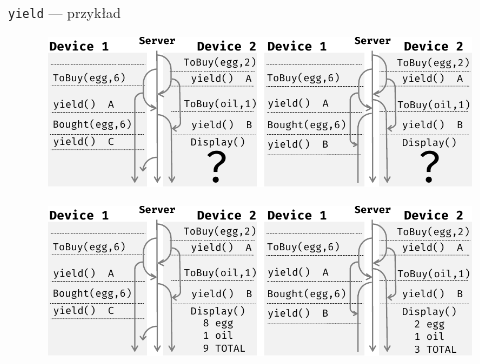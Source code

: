 \documentclass{beamer}
\begin{document}
\begin{frame}{\texttt{yield} --- przykład}
     {
        \begin{card}
            \begin{figure}[ht]
                \centering
                \includegraphics[width=\textwidth]{yieldABC_question.pdf}
            \end{figure}
        \end{card}
    }
     {
        \begin{card}
            \begin{figure}[ht]
                \centering
                \includegraphics[width=\textwidth]{yieldABC_answer.pdf}
            \end{figure}
        \end{card}
    }
\end{frame}
\end{document}
